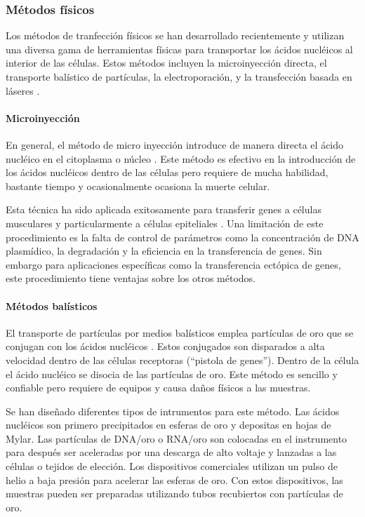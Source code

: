 \documentclass[fleqn,10pt]{SelfArx} %
\begin{document}
\subsubsection{Métodos físicos}
Los métodos de tranfección físicos se han desarrollado recientemente y utilizan una diversa gama de herramientas físicas para transportar los ácidos nucléicos al interior de las células. Estos métodos incluyen la microinyección directa, el transporte balístico de partículas, la electroporación, y la transfección basada en láseres \cite{Mehier-Humbert:2005aa}.  

\paragraph*{Microinyección}
En general, el método de micro inyección introduce de manera directa el ácido nucléico en el citoplasma o núcleo \cite{Martinou:1995aa, Ikeda:1995aa}. Este método es efectivo en la introducción de los ácidos nucléicos dentro de las células pero requiere de mucha habilidad, bastante tiempo y ocasionalmente ocasiona la muerte celular. 

Esta técnica ha sido aplicada exitosamente para transferir genes a células musculares y particularmente a células epiteliales \cite{Sawamura:2002aa, Davis:1993aa}. Una limitación de este procedimiento es la falta de control de parámetros como la concentración de DNA plasmídico, la degradación y la eficiencia en la transferencia de genes. Sin embargo para aplicaciones específicas como la transferencia ectópica de genes, este procedimiento tiene ventajas sobre los otros métodos.

\paragraph*{Métodos balísticos}
El transporte de partículas por medios balísticos emplea partículas de oro que se conjugan con los ácidos nucléicos \cite{Lo:1994aa, OBrien:2006aa}. Estos conjugados son disparados a alta velocidad dentro de las células receptoras (``pistola de genes''). Dentro de la célula el ácido nucléico se disocia de las partículas de oro.  Este método es sencillo y confiable pero requiere de equipos y causa daños físicos a las muestras. 

Se han diseñado diferentes tipos de intrumentos para este método. Las ácidos nucléicos son primero precipitados en esferas de oro y depositas en hojas de Mylar. Las partículas de DNA/oro o RNA/oro son colocadas en el instrumento para después ser aceleradas por una descarga de alto voltaje y lanzadas a las células o tejidos de elección. Los dispositivos comerciales utilizan un pulso de helio a baja presión para acelerar las esferas de oro. Con estos dispositivos, las muestras pueden ser preparadas utilizando tubos recubiertos con partículas de oro. 
\end{document}
